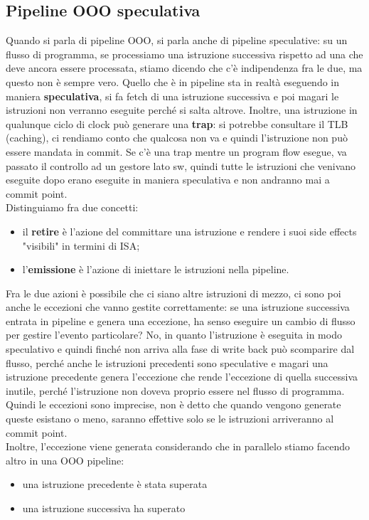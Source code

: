 \documentclass[14pt, oneside]{book}
\begin{document}
\subsection{Pipeline OOO speculativa}
Quando si parla di pipeline OOO, si parla anche di pipeline speculative: su un flusso di programma, se processiamo una istruzione successiva rispetto ad una che deve ancora essere processata, stiamo dicendo che c'è indipendenza fra le due, ma questo non è sempre vero. Quello che è in pipeline sta in realtà eseguendo in maniera \textbf{speculativa}, si fa fetch di una istruzione successiva e poi magari le istruzioni non verranno eseguite perché si salta altrove. Inoltre, una istruzione in qualunque ciclo di clock può generare una \textbf{trap}: si potrebbe consultare il TLB (caching), ci rendiamo conto che qualcosa non va e quindi l'istruzione non può essere mandata in commit. Se c'è una trap mentre un program flow esegue, va passato il controllo ad un gestore lato sw, quindi tutte le istruzioni che venivano eseguite dopo erano eseguite in maniera speculativa e non andranno mai a commit point.\\ Distinguiamo fra due concetti:
\begin{itemize}
\item il \textbf{retire} è l'azione del committare una istruzione e rendere i suoi side effects "visibili" in termini di ISA;
\item l'\textbf{emissione} è l'azione di iniettare le istruzioni nella pipeline.
\end{itemize}
Fra le due azioni è possibile che ci siano altre istruzioni di mezzo, ci sono poi anche le eccezioni che vanno gestite correttamente: se una istruzione successiva entrata in pipeline e genera una eccezione, ha senso eseguire un cambio di flusso per gestire l'evento particolare? No, in quanto l'istruzione è eseguita in modo speculativo e quindi finché non arriva alla fase di write back può scomparire dal flusso, perché anche le istruzioni precedenti sono speculative e magari una istruzione precedente genera l'eccezione che rende l'eccezione di quella successiva inutile, perché l'istruzione non doveva proprio essere nel flusso di programma.\\ Quindi le eccezioni sono imprecise, non è detto che quando vengono generate queste esistano o meno, saranno effettive solo se le istruzioni arriveranno al commit point.\\ Inoltre, l'eccezione viene generata considerando che in parallelo stiamo facendo altro in una OOO pipeline:
\begin{itemize}
\item una istruzione precedente è stata superata
\item una istruzione successiva ha superato
\end{itemize}
\end{document}
